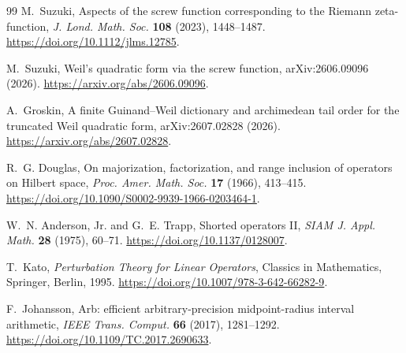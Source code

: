 \documentclass[11pt]{article}
\theoremstyle{remark}
\begin{document}
\begin{thebibliography}{99}
M.~Suzuki,
\newblock Aspects of the screw function corresponding to the Riemann
zeta-function,
\newblock \emph{J. Lond. Math. Soc.} \textbf{108} (2023), 1448--1487.
\newblock \url{https://doi.org/10.1112/jlms.12785}.

M.~Suzuki,
\newblock Weil's quadratic form via the screw function,
\newblock arXiv:2606.09096 (2026).
\newblock \url{https://arxiv.org/abs/2606.09096}.

A.~Groskin,
\newblock A finite Guinand--Weil dictionary and archimedean tail order for
the truncated Weil quadratic form,
\newblock arXiv:2607.02828 (2026).
\newblock \url{https://arxiv.org/abs/2607.02828}.

R.~G. Douglas,
\newblock On majorization, factorization, and range inclusion of operators
on Hilbert space,
\newblock \emph{Proc. Amer. Math. Soc.} \textbf{17} (1966), 413--415.
\newblock \url{https://doi.org/10.1090/S0002-9939-1966-0203464-1}.

W.~N. Anderson, Jr. and G.~E. Trapp,
\newblock Shorted operators II,
\newblock \emph{SIAM J. Appl. Math.} \textbf{28} (1975), 60--71.
\newblock \url{https://doi.org/10.1137/0128007}.

T.~Kato,
\newblock \emph{Perturbation Theory for Linear Operators},
\newblock Classics in Mathematics, Springer, Berlin, 1995.
\newblock \url{https://doi.org/10.1007/978-3-642-66282-9}.

F.~Johansson,
\newblock Arb: efficient arbitrary-precision midpoint-radius interval
arithmetic,
\newblock \emph{IEEE Trans. Comput.} \textbf{66} (2017), 1281--1292.
\newblock \url{https://doi.org/10.1109/TC.2017.2690633}.

\end{thebibliography}
\end{document}
